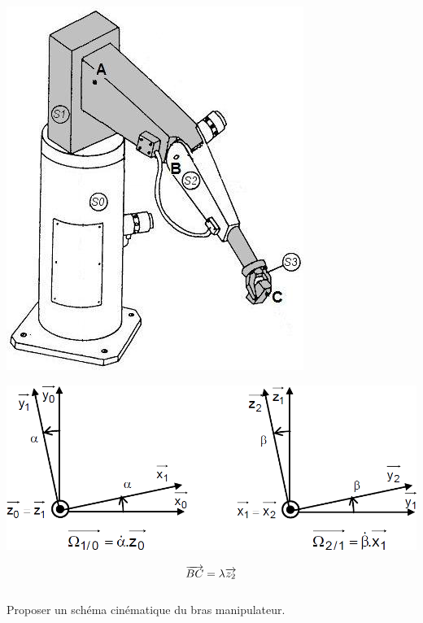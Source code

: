 \documentclass[10pt,oneside]{article}
\begin{document}
\begin{minipage}[c]{.5\linewidth}

\begin{center}
\includegraphics[width=.7\textwidth]{png/bras1}
\end{center}

\begin{center}
\includegraphics[width=\textwidth]{png/parametrage}
\end{center}

$$\overrightarrow{BC}=\lambda\overrightarrow{z_2}$$

\end{minipage}

\subparagraph{}
Proposer un schéma cinématique du bras manipulateur.
%
%
\end{document}
